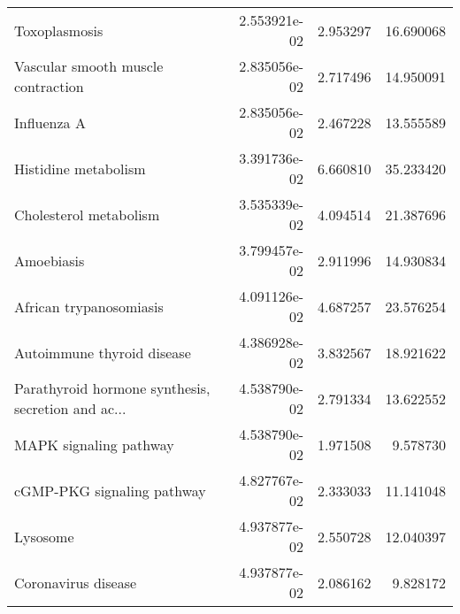 \begin{tabular}{lrrr}
                                     Toxoplasmosis &      2.553921e-02 &  2.953297 &       16.690068 \\
                Vascular smooth muscle contraction &      2.835056e-02 &  2.717496 &       14.950091 \\
                                       Influenza A &      2.835056e-02 &  2.467228 &       13.555589 \\
                              Histidine metabolism &      3.391736e-02 &  6.660810 &       35.233420 \\
                            Cholesterol metabolism &      3.535339e-02 &  4.094514 &       21.387696 \\
                                        Amoebiasis &      3.799457e-02 &  2.911996 &       14.930834 \\
                           African trypanosomiasis &      4.091126e-02 &  4.687257 &       23.576254 \\
                        Autoimmune thyroid disease &      4.386928e-02 &  3.832567 &       18.921622 \\
Parathyroid hormone synthesis, secretion and ac... &      4.538790e-02 &  2.791334 &       13.622552 \\
                            MAPK signaling pathway &      4.538790e-02 &  1.971508 &        9.578730 \\
                        cGMP-PKG signaling pathway &      4.827767e-02 &  2.333033 &       11.141048 \\
                                          Lysosome &      4.937877e-02 &  2.550728 &       12.040397 \\
                               Coronavirus disease &      4.937877e-02 &  2.086162 &        9.828172 \\
\bottomrule
\end{tabular}

